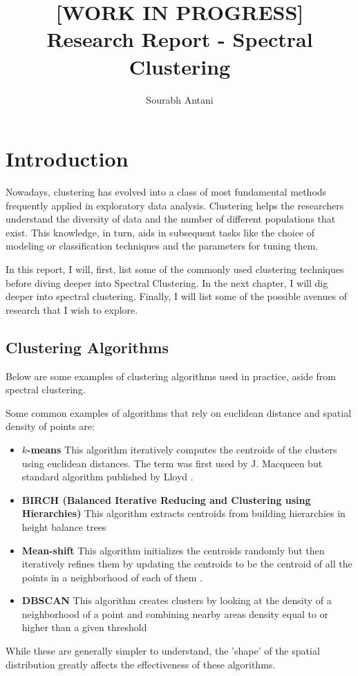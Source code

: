 \documentclass[10pt,a4paper, nocenter]{report}
\author{Sourabh Antani}
\title{[WORK IN PROGRESS] \\ Research Report - Spectral Clustering}
\date{}
\begin{document}
	\maketitle

	
	\chapter{Introduction}
    \thispagestyle{fancy}
    Nowadays, clustering has evolved into a class of most fundamental methods
    frequently applied in exploratory data analysis. Clustering helps the researchers understand the diversity of data and the number of different populations that exist. This knowledge, in turn, aids in subsequent tasks like the choice of modeling or classification techniques and the parameters for tuning them. 
	
    In this report, I will, first, list some of the commonly used clustering techniques before diving deeper into Spectral Clustering. In the next chapter, I will dig deeper into spectral clustering. Finally, I will list some of the possible avenues of research that I wish to explore. 

    \section*{Clustering Algorithms}
    Below are some examples of clustering algorithms used in practice, aside from spectral clustering. 
    
    Some common examples of algorithms that rely on euclidean distance and spatial density of points are:

    \begin{itemize}
        \item \textbf{$k$-means} This algorithm iteratively computes the centroids of the clusters using euclidean distances. The term was first used by J. Macqueen \cite{Macqueen67kmeans} but standard algorithm published by Lloyd \cite{Lloyd-82-kmeans}.
        \item \textbf{BIRCH (Balanced Iterative Reducing and Clustering using Hierarchies)} This algorithm extracts centroids from building hierarchies in height balance trees \cite{zhang-96-birch}
        \item \textbf{Mean-shift} This algorithm initializes the centroids randomly but then iteratively refines them by updating the centroids to be the centroid of all the points in a neighborhood of each of them \cite{Cheng95meanshift}.
        \item \textbf{DBSCAN} This algorithm creates clusters by looking at the density of a neighborhood of a point and combining nearby areas density equal to or higher than a given threshold \cite{Ester96adensity-based}
    \end{itemize}
        While these are generally simpler to understand, the 'shape' of the spatial distribution greatly affects the effectiveness of these algorithms. 
\end{document}
